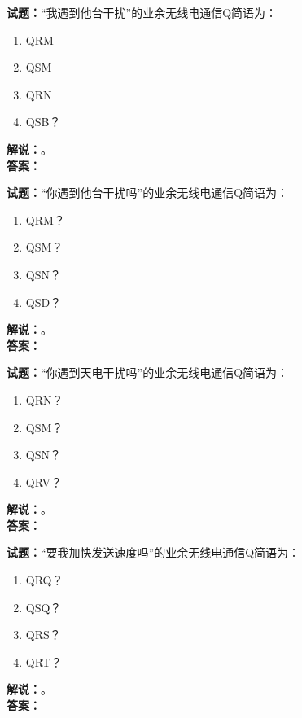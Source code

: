 \documentclass{ctexbook}
\begin{document}
\bigskip




\noindent\textbf{试题：}“我遇到他台干扰”的业余无线电通信Q简语为：
\begin{enumerate}[leftmargin=3em]
\item QRM
\item QSM
\item QRN
\item QSB？
\end{enumerate}
\noindent\textbf{解说：}\textbf{}。\\\noindent\textbf{答案：}

\bigskip




\noindent\textbf{试题：}“你遇到他台干扰吗”的业余无线电通信Q简语为：
\begin{enumerate}[leftmargin=3em]
\item QRM？
\item QSM？
\item QSN？
\item QSD？
\end{enumerate}
\noindent\textbf{解说：}\textbf{}。\\\noindent\textbf{答案：}

\bigskip




\noindent\textbf{试题：}“你遇到天电干扰吗”的业余无线电通信Q简语为：
\begin{enumerate}[leftmargin=3em]
\item QRN？
\item QSM？
\item QSN？
\item QRV？
\end{enumerate}
\noindent\textbf{解说：}\textbf{}。\\\noindent\textbf{答案：}

\bigskip




\noindent\textbf{试题：}“要我加快发送速度吗”的业余无线电通信Q简语为：
\begin{enumerate}[leftmargin=3em]
\item QRQ？
\item QSQ？
\item QRS？
\item QRT？
\end{enumerate}
\noindent\textbf{解说：}\textbf{}。\\\noindent\textbf{答案：}

\bigskip
\end{document}
